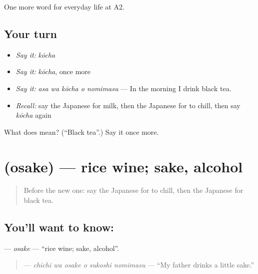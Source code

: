 \begin{grammarlens}[title={What you've built}]
One more word for everyday life at A2.
\end{grammarlens}

\subsection*{Your turn}
\begin{itemize}
\raggedright
  \item \emph{Say it:} \emph{kōcha}
  \item \emph{Say it:} \emph{kōcha}, once more
  \item \emph{Say it:} \emph{asa wa kōcha o nomimasu} — In the morning I drink black tea.
  \item \emph{Recall:} say the Japanese for milk, then the Japanese for to chill, then say \emph{kōcha} again
\end{itemize}

\begin{tcolorbox}[breakable,colback=teal!4,colframe=teal!35!black,title={Before you move on}]
What does  mean? (\textquotedblleft{}Black tea\textquotedblright{}.) Say it once more.
\end{tcolorbox}
\section[\texorpdfstring{\ja{おさけ} (osake)}{おさけ (osake)}]{ (osake) — rice wine; sake, alcohol}

\label{lesson:JA-C179-osake}



\begin{quote}
Before the new one: say the Japanese for to chill, then the Japanese for black tea.
\end{quote}

\subsection*{You'll want to know: }
\textbf{} — \emph{osake} — \textquotedblleft{}rice wine; sake, alcohol\textquotedblright{}.

\begin{quote}
\textbf{   } — \emph{chichi wa osake o sukoshi nomimasu} — \textquotedblleft{}My father drinks a little sake.\textquotedblright{}
\end{quote}

